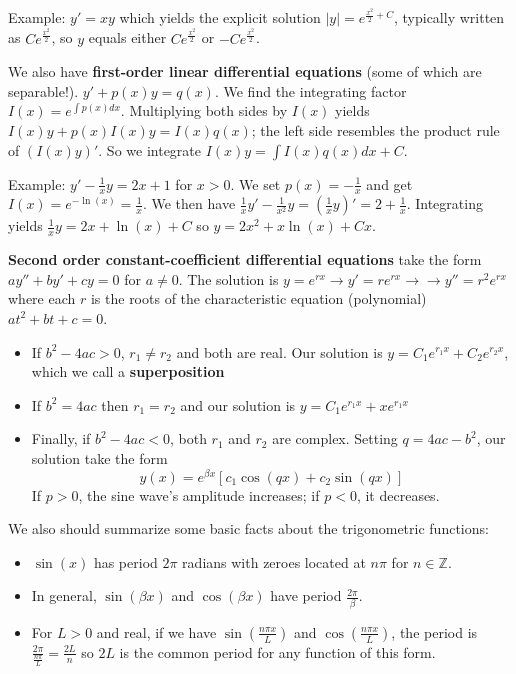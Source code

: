 \documentclass[12pt]{article}
\newcommand{\Z}{\mathbb{Z}}
\begin{document}
Example: $y' = xy$ which yields the explicit solution $|y| = e^{\frac{x^2}{2} + C}$, typically written as $Ce^{\frac{x^2}{2}}$, so $y$ equals either $Ce^{\frac{x^2}{2}}$ or $-Ce^{\frac{x^2}{2}}$.

We also have \textbf{first-order linear differential equations} (some of which are separable!). $y' + p(x)y = q(x)$. We find the integrating factor $I(x) = e^{\int p(x)dx}$. Multiplying both sides by $I(x)$ yields $I(x)y + p(x)I(x)y = I(x)q(x)$; the left side resembles the product rule of $\left(I(x)y\right)'$. So we integrate $I(x)y = \int I(x)q(x)dx + C$.

Example: $y' - \frac{1}{x}y = 2x + 1$ for $x > 0$. We set $p(x) = -\frac{1}{x}$ and get $I(x) = e^{-\ln(x)} = \frac{1}{x}$. We then have $\frac{1}{x}y' - \frac{1}{x^2}y = \left( \frac{1}{x}y \right)' = 2 + \frac{1}{x}$. Integrating yields $\frac{1}{x}y = 2x + \ln(x) + C$ so $y = 2x^2 + x\ln(x) + Cx$.

\textbf{Second order constant-coefficient differential equations} take the form $ay'' + by' + cy = 0$ for $a \neq 0$. The solution is $y = e^{rx} \to y' = re^{rx} \to \to y'' = r^2e^{rx}$ where each $r$ is the roots of the characteristic equation (polynomial) $at^2 + bt + c = 0$. \begin{itemize}
    \item If $b^2 - 4ac > 0$, $r_1 \neq r_2$ and both are real. Our solution is $y = C_1e^{r_1x} + C_2e^{r_2x}$, which we call a \textbf{superposition}
    \item If $b^2 = 4ac$ then $r_1 = r_2$ and our solution is $y = C_1e^{r_1x} + xe^{r_1x}$
    \item Finally, if $b^2 - 4ac < 0$, both $r_1$ and $r_2$ are complex. Setting $q = 4ac - b^2$, our solution take the form $$y(x) = e^{\beta x} \left[ c_1 \cos(qx) + c_2 \sin(qx) \right]$$ If $p > 0$, the sine wave's amplitude increases; if $p < 0$, it decreases.
\end{itemize}


We also should summarize some basic facts about the trigonometric functions: \begin{itemize}
    \item $\sin(x)$ has period $2\pi$ radians with zeroes located at $n\pi$ for $n \in \Z$.
    \item In general, $\sin(\beta x)$ and $\cos(\beta x)$ have period $\frac{2\pi}{\beta}$.
    \item For $L > 0$ and real, if we have $\sin(\frac{n\pi x}{L})$ and $\cos(\frac{n\pi x}{L})$, the period is $\frac{2\pi}{\frac{n\pi}{L}} = \frac{2L}{n}$ so $2L$ is the common period for any function of this form.
\end{itemize}
\end{document}
